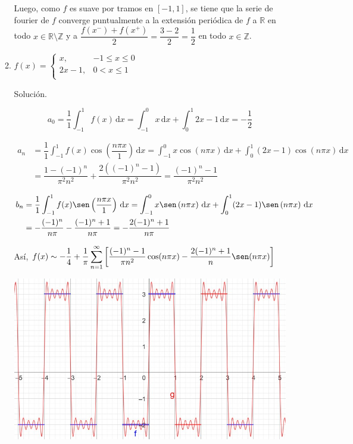 \documentclass[fleqn]{article}
\newcommand{\real}{\mathbb{R}}
\newcommand{\ent}{\mathbb{Z}}
\newcommand{\intg}[3]{\int_{#1}^{#2} #3 \, \mathrm{d}x}
\begin{document}
\begin{enumerate}[I.]
\begin{enumerate}[(1)]
			Luego, como $f$ es suave por tramos en $ [-1,1] $, se tiene que la serie de fourier de $f$ converge puntualmente a la extensión periódica de $f$ a $ \real $ en todo $ x \in \real \setminus \ent $ y a $ \dfrac{f(x^-) + f(x^+)}{2} = \dfrac{3-2}{2} = \dfrac{1}{2} $ en todo $ x \in \ent $.

			\bfseries 
			\item $ f(x) = \begin{cases}
				x, & -1 \leq x \leq 0 \\
				2x - 1, & 0 < x \leq 1 \\
			\end{cases} $

			Solución.

			\normalfont

			\begin{equation*}
				a_0 = \dfrac{1}{1} \intg{-1}{1}{f(x)} = \intg{-1}{0}{x} + \intg{0}{1}{2x - 1} = -\dfrac{1}{2}
			\end{equation*}

			\begin{align*}
				a_n &= \dfrac{1}{1} \intg{-1}{1}{f(x) \cos \left( \dfrac{n \pi x}{1} \right)} = \intg{-1}{0}{x \cos \left(n \pi x \right)} + \intg{0}{1}{(2x - 1) \cos \left(n \pi x \right)} \\
				&= \dfrac{1 - (-1)^n}{\pi^2 n^2} + \dfrac{2((-1)^n - 1)}{\pi^2 n^2} = \dfrac{(-1)^n - 1}{\pi^2 n^2} 
			\end{align*}

			\begin{align*}
				b_n &= \dfrac{1}{1} \intg{-1}{1}{f(x) \sen \left( \dfrac{n \pi x}{1} \right)} = \intg{-1}{0}{x \sen \left(n \pi x \right)} + \intg{0}{1}{(2x - 1) \sen \left(n \pi x \right)} \\
				&= -\dfrac{(-1)^n}{n \pi} - \dfrac{(-1)^n + 1}{n \pi} = - \dfrac{2(-1)^n + 1}{n \pi}
			\end{align*}

			Así, $ \displaystyle f(x) \sim -\dfrac{1}{4} + \dfrac{1}{\pi} \sum_{n=1}^{\infty} \left[ \dfrac{(-1)^n - 1}{\pi n^2} \cos (n \pi x) - \dfrac{2(-1)^n + 1}{n} \sen (n \pi x) \right] $

			\includegraphics[width=\linewidth]{Ejer1.jpg}


\end{enumerate}
\end{enumerate}
\end{document}
